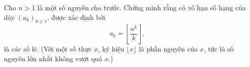 \ifshowproblem
\begin{problem}\label{example:IND-2015-TST4-P3}
	Cho $n > 1$ là một số nguyên cho trước. Chứng minh rằng có vô hạn số hạng của dãy $(a_k)_{k \ge 1}$, được xác định bởi
	\[
		a_k = \left\lfloor \frac{n^k}{k} \right\rfloor,
	\]
	là các số lẻ. (Với một số thực $x$, ký hiệu $\lfloor x \rfloor$ là phần nguyên của $x$, tức là số nguyên lớn nhất không vượt quá $x$.)
\end{problem}
\fi

\footnotemark
{}
\fi